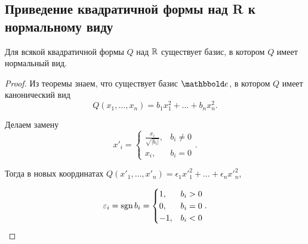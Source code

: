 \subsection{Приведение квадратичной формы над R к нормальному виду}

\begin{corollary}
    Для всякой квадратичной формы $Q$ над $\mathbb{R}$ существует базис, в котором $Q$ имеет нормальный вид.
\end{corollary}

\begin{proof}
    Из теоремы знаем, что существует базис $\E$, в котором $Q$ имеет канонический вид
    \begin{equation*}
        Q(x_1, \dots, x_n) = b_1 x_1^2 + \dots + b_n x_n^2
    .\end{equation*}

    Делаем замену
    \begin{equation*}
        x'_i = \begin{cases}
            \frac{x_i}{\sqrt{|b_i|}}, &b_i \neq 0 \\
            x_i, &b_i = 0
        \end{cases}
    .\end{equation*}

    Тогда в новых координатах $Q(x'_1, \dots, x'_n) = \epsilon_1 x'^2_1 + \dots + \epsilon_n x'^2_n$,

    \begin{equation*}
        \varepsilon_i = \operatorname{\mathop{\mathrm{sgn}}} b_i = \begin{cases}
            1, &b_i > 0 \\
            0, &b_i = 0 \\
            -1, &b_i < 0
        \end{cases}
    .\end{equation*}
\end{proof}
